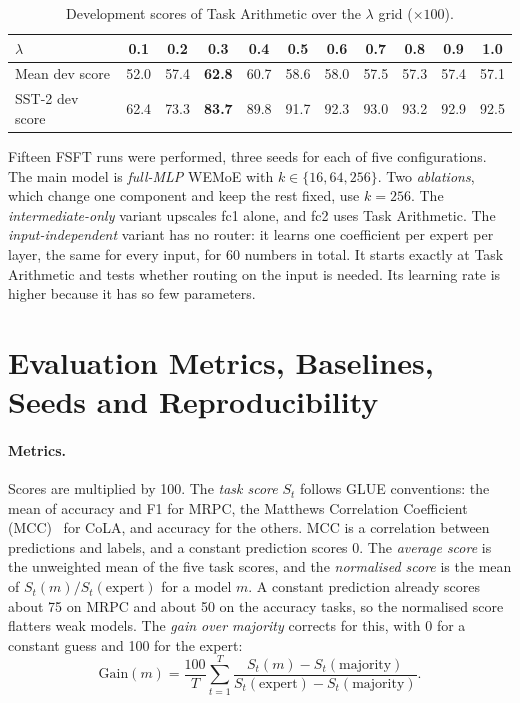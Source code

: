 \begin{table}[htbp]
  \centering\tablestyle
  \caption{Development scores of Task Arithmetic over the $\lambda$ grid ($\times100$).}
  \label{tab:lambda}
  \begin{tabular}{l c c c c c c c c c c}
    \toprule
    $\lambda$ & 0.1 & 0.2 & \textbf{0.3} & 0.4 & 0.5 & 0.6 & 0.7 & 0.8 & 0.9 & 1.0\\
    \midrule
    Mean dev score & 52.0 & 57.4 & \textbf{62.8} & 60.7 & 58.6 & 58.0 & 57.5 & 57.3 & 57.4 & 57.1\\
    SST-2 dev score & 62.4 & 73.3 & \textbf{83.7} & 89.8 & 91.7 & 92.3 & 93.0 & 93.2 & 92.9 & 92.5\\
    \bottomrule
  \end{tabular}
\end{table}

Fifteen FSFT runs were performed, three seeds for each of five configurations. The main model is \emph{full-MLP} WEMoE with $k\in\{16,64,256\}$. Two \emph{ablations}, which change one component and keep the rest fixed, use $k=256$. The \emph{intermediate-only} variant upscales fc1 alone, and fc2 uses Task Arithmetic. The \emph{input-independent} variant has no router: it learns one coefficient per expert per layer, the same for every input, for 60 numbers in total. It starts exactly at Task Arithmetic and tests whether routing on the input is needed. Its learning rate is higher because it has so few parameters.

\section{Evaluation Metrics, Baselines, Seeds and Reproducibility}
\label{sec:metrics}

\paragraph{Metrics.} Scores are multiplied by 100. The \emph{task score} $S_t$ follows GLUE conventions: the mean of accuracy and F1 for MRPC, the Matthews Correlation Coefficient (MCC)~\cite{matthews1975mcc} for CoLA, and accuracy for the others. MCC is a correlation between predictions and labels, and a constant prediction scores 0. The \emph{average score} is the unweighted mean of the five task scores, and the \emph{normalised score} is the mean of $S_t(m)/S_t(\mathrm{expert})$ for a model $m$. A constant prediction already scores about 75 on MRPC and about 50 on the accuracy tasks, so the normalised score flatters weak models. The \emph{gain over majority} corrects for this, with 0 for a constant guess and 100 for the expert:
\begin{equation}
\mathrm{Gain}(m)=\frac{100}{T}\sum_{t=1}^{T}\frac{S_t(m)-S_t(\mathrm{majority})}{S_t(\mathrm{expert})-S_t(\mathrm{majority})}.
\label{eq:gain}
\end{equation}

